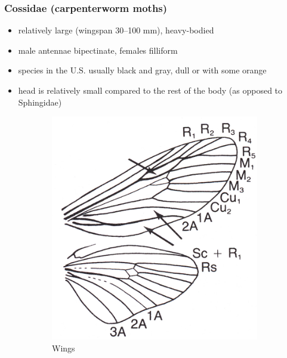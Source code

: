 \documentclass[letterpaper, 11pt]{article}
\begin{document}
\subsubsection{Cossidae (carpenterworm moths)}
\begin{itemize}
\item relatively large (wingspan 30--100 mm), heavy-bodied
\item male antennae bipectinate, females filliform
\item species in the U.S. usually black and gray, dull or with some orange
\item head is relatively small compared to the rest of the body (as opposed to Sphingidae)
\end{itemize}

\begin{figure}[ht!]
    \centering
    \begin{subfigure}[ht!]{0.38\textwidth}
        \includegraphics[width=\textwidth]{image44}
        \caption{Wings}
        \label{fig:cossid1}
    \end{subfigure}
    \qquad %
    \begin{subfigure}[ht!]{0.48\textwidth}

\end{subfigure}
\end{figure}
\end{document}
